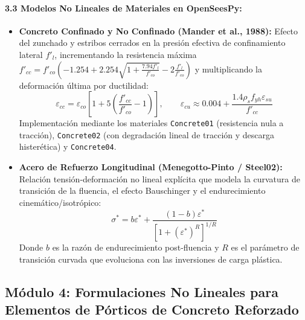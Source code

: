 \documentclass[11pt,letterpaper]{article}
\begin{document}
\begin{modulebox}
\paragraph{3.3 Modelos No Lineales de Materiales en OpenSeesPy:}
\begin{itemize}
    \item \textbf{Concreto Confinado y No Confinado (Mander et al., 1988):}
    Efecto del zunchado y estribos cerrados en la presión efectiva de confinamiento lateral $f'_l$, incrementando la resistencia máxima $f'_{cc} = f'_{co} \left(-1.254 + 2.254\sqrt{1 + \frac{7.94 f'_l}{f'_{co}}} - 2 \frac{f'_l}{f'_{co}}\right)$ y multiplicando la deformación última por ductilidad:
    \begin{equation}
        \varepsilon_{cc} = \varepsilon_{co} \left[ 1 + 5 \left( \frac{f'_{cc}}{f'_{co}} - 1 \right) \right], \qquad \varepsilon_{cu} \approx 0.004 + \frac{1.4 \rho_s f_{yh} \varepsilon_{su}}{f'_{cc}}
    \end{equation}
    Implementación mediante los materiales \texttt{Concrete01} (resistencia nula a tracción), \texttt{Concrete02} (con degradación lineal de tracción y descarga histerética) y \texttt{Concrete04}.
    \item \textbf{Acero de Refuerzo Longitudinal (Menegotto-Pinto / Steel02):}
    Relación tensión-deformación no lineal explícita que modela la curvatura de transición de la fluencia, el efecto Bauschinger y el endurecimiento cinemático/isotrópico:
    \begin{equation}
        \sigma^* = b \varepsilon^* + \frac{(1 - b)\varepsilon^*}{\left[ 1 + (\varepsilon^*)^R \right]^{1/R}}
    \end{equation}
    Donde $b$ es la razón de endurecimiento post-fluencia y $R$ es el parámetro de transición curvada que evoluciona con las inversiones de carga plástica.
\end{itemize}
\end{modulebox}

\subsection{Módulo 4: Formulaciones No Lineales para Elementos de Pórticos de Concreto Reforzado}
\end{document}
